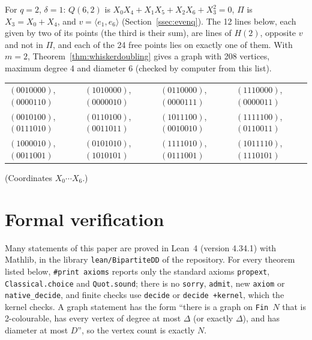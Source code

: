 \documentclass[11pt]{amsart}
\theoremstyle{definition}
\theoremstyle{remark}
\numberwithin{equation}{section}
\begin{document}
For $q=2$, $\delta=1$: $Q(6,2)$ is $X_0X_4+X_1X_5+X_2X_6+X_3^2=0$, $\Pi$ is $X_3=X_0+X_4$, and $v=\langle e_1,e_6\rangle$
(Section~\ref{ssec:evenq}). The 12 lines below, each given by two of its points (the third is their sum), are lines of
$H(2)$, opposite $v$ and not in $\Pi$, and each of the 24 free points lies on exactly one of them. With $m=2$,
Theorem~\ref{thm:whiskerdoubling} gives a graph with 208 vertices, maximum degree 4 and diameter 6 (checked by computer from
this list).
\begin{center}
\begin{tabular}{@{}l l l l@{}}
$(0010000)$, $(0000110)$ & $(1010000)$, $(0000010)$ & $(0110000)$, $(0000111)$ & $(1110000)$, $(0000011)$\\
$(0010100)$, $(0111010)$ & $(0110100)$, $(0011011)$ & $(1011100)$, $(0010010)$ & $(1111100)$, $(0110011)$\\
$(1000010)$, $(0011001)$ & $(0101010)$, $(1010101)$ & $(1111010)$, $(0111001)$ & $(1011110)$, $(1110101)$
\end{tabular}
\end{center}
(Coordinates $X_0\cdots X_6$.)

\section{Formal verification}\label{app:lean}

Many statements of this paper are proved in Lean~4 (version 4.34.1) with Mathlib, in the library
\texttt{lean/BipartiteDD} of the repository. For every theorem listed below, \texttt{\#print axioms} reports only the
standard axioms \texttt{propext}, \texttt{Classical.choice} and \texttt{Quot.sound}; there is no \texttt{sorry},
\texttt{admit}, new \texttt{axiom} or \texttt{native\_decide}, and finite checks use \texttt{decide} or \texttt{decide +kernel},
which the kernel checks. A graph statement has the form ``there is a graph on \texttt{Fin $N$} that is 2-colourable, has every
vertex of degree at most $\Delta$ (or exactly $\Delta$), and has diameter at most $D$'', so the vertex count is exactly $N$.

\end{document}
